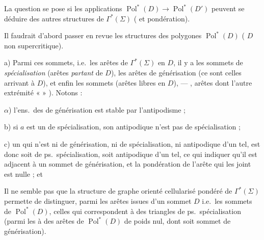 \documentclass[11pt,a4paper]{article}
\begin{document}
La question se pose si les \struck{\ill{}} applications $\operatorname{Pol}^{*}(D) \to \operatorname{Pol}^{*}(D')$ peuvent se déduire des autres structures de $\Gamma^{*}(\Sigma)$ (  et \struck{\ill{}} pondération).

Il faudrait d'abord passer en revue les structures des polygones $\operatorname{Pol}^{*}(D)$ ( $D$ non supercritique).

a) Parmi ces sommets,  i.e.\ les arêtes de $\Gamma^{*}(\Sigma)$ en $D$, il y a les sommets de \emph{spécialisation} (arêtes \struck{\ill{}} \emph{partant} de $D$), les arêtes de générisation (ce sont celles arrivant à $D$), et enfin les sommets  (arêtes libres en $D$), --- , arêtes dont l'autre extrémité \ill{} «  » \ill{} \ill{}). Notons :

$\alpha$) l'ens.\ des   de générisation est stable par l'antipodisme ;

b) si $a$ est un   de spécialisation, son antipodique n'est pas   de spécialisation ;

c) un   qui n'est ni \struck{\ill{}} de générisation, ni de spécialisation, ni antipodique d'un tel,  est donc soit de ps.\ spécialisation, soit antipodique d'un tel, ce qui  indiquer qu'il est adjacent à un sommet de générisation, et la pondération de l'arête qui les joint est nulle ; et 

Il ne semble pas que la structure de graphe orienté cellularisé pondéré de $\Gamma^{*}(\Sigma)$ permette de distinguer, parmi les  arêtes issues d'un sommet $D$ i.e.\ les sommets de $\operatorname{Pol}^{*}(D)$, celles qui correspondent à des triangles de ps.\ spécialisation (parmi les   à des arêtes \struck{\ill{}} de $\operatorname{Pol}^{*}(D)$ de poids nul, dont   soit sommet de générisation).
\end{document}

